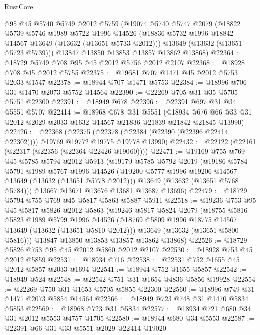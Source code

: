 \begin{lexlean}{RustCore}
\begin{coremodule}
    @95
    @45
    @5740
    @5749
    @2012
    @5759
    (@19074
      @5740
      @5747
      @2079
      (@18822
        @5739
        @5746
        @1989
        @5722
        @1996
        @14526
        (@18836 @5732 @1996 @18842 @14567 @13649 (@13632 (@13651 @5733 @2012)))
        @13649
        (@13632 (@13651 @5723 @5739)))
      @13847
      @13850
      @13853
      @13857
      @13862
      @13868)
@22364 := @18729 @5749 @708 @95 @45 @2012 @5756 @2012 @2107
@22368 := @18928 @708 @45 @2012 @5755
@22375 := @19681 @707 @1471 @45 @2012 @5753 @2033 @1547
@22378 := @18944 @707 @1471 @5753
@22384 := @18996 @706 @31 @1470 @2073 @5752 @14564
@22390 := @22269 @705 @31 @35 @5705 @5751 @22300
@22391 := @18949 @678
@22396 := @22391 @697 @31 @34 @5551 @5707
@22414 := @18968
    @678
    @31
    @5551
    (@18934 @676 @66 @33 @31 @2012 @2029 @2033 @1632 @14567 @21836 @21839 @21842 @21845 @13990)
@22426 := @22368
    (@22375 (@22378 (@22384 (@22390 (@22396 @22414 @22302)))) @19769 @19772 @19775 @19778 @13990)
@22432 := @22122 (@22161 (@22317 (@22356 (@22364 @22426 @19060))))
@22471 := @19169
    @755
    @769
    @45
    @5785
    @5794
    @2012
    @5913
    (@19179
      @5785
      @5792
      @2019
      (@19186
        @5784
        @5791
        @1989
        @5767
        @1996
        @14526
        (@19200 @5777 @1996 @19206 @14567 @13649 (@13632 (@13651 @5778 @2012)))
        @13649
        (@13632 (@13651 @5768 @5784)))
      @13667
      @13671
      @13676
      @13681
      @13687
      @13696)
@22479 := @18729 @5794 @755 @769 @45 @5817 @5863 @5887 @5911
@22518 := @19236
    @753
    @95
    @45
    @5817
    @5826
    @2012
    @5863
    (@19246
      @5817
      @5824
      @2079
      (@18755
        @5816
        @5823
        @1989
        @5799
        @1996
        @14526
        (@18769 @5809 @1996 @18775 @14567 @13649 (@13632 (@13651 @5810 @2012)))
        @13649
        (@13632 (@13651 @5800 @5816)))
      @13847
      @13850
      @13853
      @13857
      @13862
      @13868)
@22526 := @18729 @5826 @753 @95 @45 @2012 @5860 @2012 @2107
@22530 := @18928 @753 @45 @2012 @5859
@22531 := @18934 @716
@22538 := @22531 @752 @1655 @45 @2012 @5857 @2033 @1694
@22541 := @18944 @752 @1655 @5857
@22542 := @18949 @524
@22548 := @22542 @751 @31 @1654 @4836 @5856 @19928
@22554 := @22269 @750 @31 @1653 @5705 @5855 @22300
@22560 := @18996 @749 @31 @1471 @2073 @5854 @14564
@22566 := @18949 @723 @748 @31 @1470 @5834 @5853
@22569 := @18968 @723 @31 @5834
@22577 := @18934 @721 @680 @34 @31 @2012 @5553 @4757 @1705
@22580 := @18944 @680 @34 @5553
@22587 := @22391 @66 @31 @33 @5551 @2029 @22414 @19020

\end{coremodule}
\end{lexlean}
